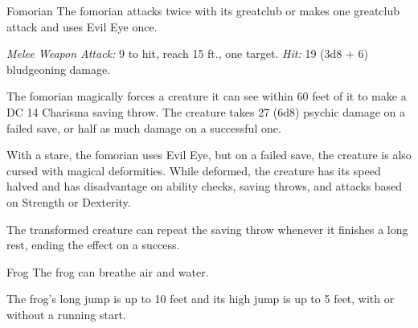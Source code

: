 \documentclass[10pt,a4paper,twoside,bg=print,twocolumn,openany,nodeprecatedcode]{dndbook}
\begin{document}
\begin{DndMonster}[float=t]{Fomorian}
\DndMonsterBasics[
armor-class = {14 (natural armor)},
hit-points = {\DndDice{13d12 + 65}},
speed = {30 ft.}
]
\DndMonsterAbilityScores[
 str = 23,
 dex = 10,
 con = 20,
 int = 9,
 wis = 14,
 cha = 6
]
\DndMonsterDetails[
skills = {Perception +8, Stealth +3},
senses = {darkvision 120 ft., passive perception 18},
languages = {Giant, Undercommon},
challenge = 8,
]
The fomorian attacks twice with its greatclub or makes one greatclub attack and uses Evil Eye once.

\textsl{Melee Weapon Attack:} 9 to hit, reach 15 ft., one target. \textsl{Hit:} 19 (3d8 + 6) bludgeoning damage.

The fomorian magically forces a creature it can see within 60 feet of it to make a DC 14 Charisma saving throw. The creature takes 27 (6d8) psychic damage on a failed save, or half as much damage on a successful one.

With a stare, the fomorian uses Evil Eye, but on a failed save, the creature is also cursed with magical deformities. While deformed, the creature has its speed halved and has disadvantage on ability checks, saving throws, and attacks based on Strength or Dexterity.

The transformed creature can repeat the saving throw whenever it finishes a long rest, ending the effect on a success.

\end{DndMonster}



\begin{DndMonster}[float=t]{Frog}
\DndMonsterBasics[
armor-class = {11},
hit-points = {\DndDice{1d4 - 1}},
speed = {20 ft., swim 20 ft.}
]
\DndMonsterAbilityScores[
 str = 1,
 dex = 13,
 con = 8,
 int = 1,
 wis = 8,
 cha = 3
]
\DndMonsterDetails[
skills = {Perception +1, Stealth +3},
senses = {darkvision 30 ft., passive perception 11},
challenge = 0,
]
The frog can breathe air and water.

The frog's long jump is up to 10 feet and its high jump is up to 5 feet, with or without a running start.

\end{DndMonster}
\end{document}
